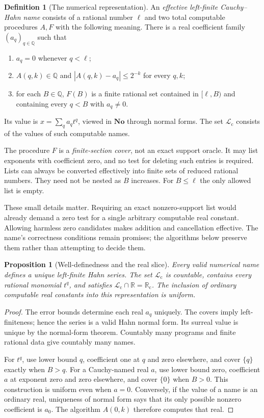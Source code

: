 \documentclass[11pt,letterpaper]{article}
\numberwithin{equation}{section}
\newtheorem{proposition}[theorem]{Proposition}
\theoremstyle{definition}
\newtheorem{definition}[theorem]{Definition}
\theoremstyle{remark}
\newcommand{\No}{\mathbf{No}}
\newcommand{\Rc}{\mathbb R_{\mathrm c}}
\newcommand{\Lc}{\mathcal L_{\mathrm c}}
\newcommand{\Q}{\mathbb Q}
\newcommand{\R}{\mathbb R}
\begin{document}
\begin{definition}[The numerical representation]\label{def:elf}
An \emph{effective left-finite Cauchy--Hahn name} consists of a rational
number $\ell$ and two total computable procedures $A,F$ with the following
meaning. There is a real coefficient family $(a_q)_{q\in\Q}$ such that
\begin{enumerate}[label=\textup{(\arabic*)},leftmargin=2em]
\item $a_q=0$ whenever $q<\ell$;
\item $A(q,k)\in\Q$ and $|A(q,k)-a_q|\le2^{-k}$ for every $q,k$;
\item for each $B\in\Q$, $F(B)$ is a finite rational set contained in
$[\ell,B)$ and containing every $q<B$ with $a_q\ne0$.
\end{enumerate}
Its value is $x=\sum_qa_qt^q$, viewed in $\No$ through normal forms.
The set $\Lc$ consists of the values of such computable names.
\end{definition}

The procedure $F$ is a \emph{finite-section cover}, not an exact support
oracle. It may list exponents with coefficient zero, and no test for deleting
such entries is required. Lists can always be converted effectively into
finite sets of reduced rational numbers. They need not be nested as $B$
increases. For $B\le\ell$ the only allowed list is empty.

These small details matter. Requiring an exact nonzero-support list would
already demand a zero test for a single arbitrary computable real constant.
Allowing harmless zero candidates makes addition and cancellation effective.
The name's correctness conditions remain promises; the algorithms below
preserve them rather than attempting to decide them.

\begin{proposition}[Well-definedness and the real slice]
\label{prop:realslice}
Every valid numerical name defines a unique left-finite Hahn series.
The set $\Lc$ is countable, contains every rational monomial $t^q$, and
satisfies $\Lc\cap\R=\Rc$. The inclusion of ordinary computable real
constants into this representation is uniform.
\end{proposition}
\begin{proof}
The error bounds determine each real $a_q$ uniquely. The covers imply
left-finiteness; hence the series is a valid Hahn normal form. Its surreal
value is unique by the normal-form theorem. Countably many programs and
finite rational data give countably many names.

For $t^q$, use lower bound $q$, coefficient one at $q$ and zero elsewhere,
and cover $\{q\}$ exactly when $B>q$. For a Cauchy-named real $a$, use
lower bound zero, coefficient $a$ at exponent zero and zero elsewhere,
and cover $\{0\}$ when $B>0$. This construction is uniform even when
$a=0$. Conversely, if the value of a name is an ordinary real, uniqueness
of normal form says that its only possible nonzero coefficient is $a_0$.
The algorithm $A(0,k)$ therefore computes that real.
\end{proof}
\end{document}
